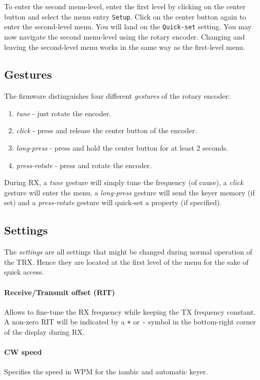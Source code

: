 \documentclass[10pt, a4paper,twoside,openright]{scrartcl}
\begin{document}
To enter the second menu-level, enter the first level by clicking on the center button and select the menu entry \texttt{Setup}. Click on the center button again to enter the second-level menu. You will land on the \texttt{Quick-set} setting. You may now navigate the second menu-level using the rotary encoder. Changing and leaving the second-level menu works in the same way as the first-level menu. 


\subsection{Gestures}
The firmware distinguishes four different \emph{gestures} of the rotary encoder:
\begin{enumerate}
 \item \emph{tune} - just rotate the encoder.
 \item \emph{click} - press and release the center button of the encoder.
 \item \emph{long-press} - press and hold the center button for at least 2 seconds.
 \item \emph{press-rotate} - press and rotate the encoder.
\end{enumerate}

During RX, a \emph{tune} gesture will simply tune the frequency (of cause), a \emph{click} gesture will enter the menu, a \emph{long-press} gesture will send the keyer memory (if set) and a \emph{press-rotate} gesture will quick-set a property (if specified).


\subsection{Settings}
The \emph{settings} are all settings that might be changed during normal operation of the TRX. Hence they are located at the first level of the menu for the sake of quick access.
 
\paragraph{Receive/Transmit offset (RIT)}
Allows to fine-tune the RX frequency while keeping the TX frequency constant. A non-zero RIT will be indicated by a \texttt{+} or \texttt{-} symbol in the bottom-right corner of the display during RX. 

\paragraph{CW speed}
Specifies the speed in WPM for the iambic and automatic keyer.
\end{document}
